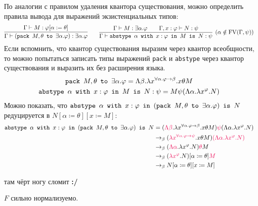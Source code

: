По аналогии с правилом удаления квантора существования, можно определить правила вывода для выражений экзистенциальных типов:
\[
    \infer{\Gamma\vdash (\pack{M, \theta}{\exists \alpha . \varphi}) : \exists \alpha.\varphi}
        {\Gamma \vdash M : \varphi[\alpha := \theta]} \qquad
    \infer[(\alpha \notin \FV(\Gamma, \psi))]
        {\Gamma \vdash \abstype{\alpha}{x:\varphi}{M}{N:\psi}}
        {\Gamma \vdash M : \exists \alpha . \varphi && \Gamma, x : \varphi \vdash N : \psi}
\]
Если вспомнить, что квантор существования выразим через квантор всеобщности, то можно попытаться записать типы выражений
\texttt{pack} и \texttt{abstype} через квантор существования и выразить их без расширения языка.
\begin{gather*}
    \mathinner{\mathtt{pack}}~M, \theta~\mathinner{\mathtt{to}}~\exists \alpha . \varphi = 
        \Lambda \beta . \lambda x^{\forall \alpha . \varphi \rightarrow \beta} . x \theta M \\
    \mathinner{\mathtt{abstype}}~\alpha~\mathinner{\mathtt{with}}~x : \varphi~\mathinner{\mathtt{in}}~M~\mathinner{\mathtt{is}}~N:\psi =
        M \psi (\Lambda \alpha . \lambda x ^ \varphi . N)
\end{gather*}
Можно показать, что $\mathinner{\mathtt{abstype}}~\alpha~\mathinner{\mathtt{with}}~x:\varphi~\mathinner{\mathtt{in}}~(\mathinner{\mathtt{pack}}~M,\theta~\mathinner{\mathtt{to}}~\exists\alpha .\varphi)~\mathinner{\mathtt{is}}~N$
        редуцируется в $N[\alpha\coloneqq\theta][x\coloneqq M]$:
\begin{align*}
    \abstype{\alpha}{x:\varphi}{(\pack{M,\theta}{\exists\alpha .\varphi})}{N}
    &= (\reduction{\Lambda \beta} . \lambda x^{\forall \alpha . \varphi \rightarrow \beta} . x \theta M)
        \reduction{\psi} (\Lambda \alpha . \lambda x ^ \varphi . N) \\
    &\rightarrow_\beta (\reduction{\lambda x^{\forall \alpha . \varphi \rightarrow \psi}} . x \theta M)
        \reduction{(\Lambda \alpha . \lambda x ^ \varphi . N)} \\
    &\rightarrow_\beta (\reduction{\Lambda \alpha} . \lambda x^\varphi . N) \reduction\theta M \\
    &\rightarrow_\beta (\reduction{\lambda x^\varphi} . N)[\alpha\coloneqq\theta] \reduction M \\
    &\rightarrow_\beta N[\alpha\coloneqq\theta][x\coloneqq M]
\end{align*}

\begin{example} \todo там чёрт ногу сломит \textbf{:/}
\end{example}

\begin{statement}
    $F$ сильно нормализуемо.
\end{statement}

